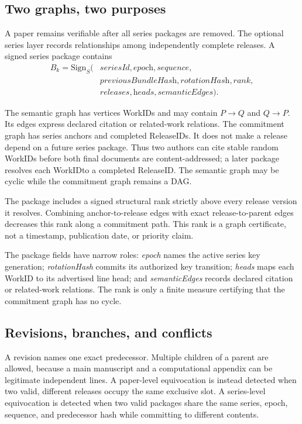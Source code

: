 \documentclass[acmsmall,screen,review,nonacm]{acmart}
\newcommand{\workid}{\textsf{WorkID}}
\newcommand{\releaseid}{\textsf{ReleaseID}}
\begin{document}
\subsection{Two graphs, two purposes}

A paper remains verifiable after all series packages are removed. The optional series layer records relationships among independently complete releases. A signed series package contains
\[
\begin{aligned}
  B_k = \mathrm{Sign}_{S}(&\textit{seriesId},\textit{epoch},\textit{sequence},\\
                          &\textit{previousBundleHash},\textit{rotationHash},\textit{rank},\\
                          &\textit{releases},\textit{heads},\textit{semanticEdges}).
\end{aligned}
\]

The semantic graph has vertices \workid s and may contain $P \rightarrow Q$ and $Q \rightarrow P$. Its edges express declared citation or related-work relations. The commitment graph has series anchors and completed \releaseid s. It does not make a release depend on a future series package. Thus two authors can cite stable random \workid s before both final documents are content-addressed; a later package resolves each \workid to a completed \releaseid. The semantic graph may be cyclic while the commitment graph remains a DAG.

The package includes a signed structural rank strictly above every release version it resolves. Combining anchor-to-release edges with exact release-to-parent edges decreases this rank along a commitment path. This rank is a graph certificate, not a timestamp, publication date, or priority claim.

The package fields have narrow roles: \textit{epoch} names the active series
key generation; \textit{rotationHash} commits its authorized key transition;
\textit{heads} maps each WorkID to its advertised line head; and
\textit{semanticEdges} records declared citation or related-work relations.
The rank is only a finite measure certifying that the commitment graph has no
cycle.

\subsection{Revisions, branches, and conflicts}

A revision names one exact predecessor. Multiple children of a parent are allowed, because a main manuscript and a computational appendix can be legitimate independent lines. A paper-level equivocation is instead detected when two valid, different releases occupy the same exclusive slot. A series-level equivocation is detected when two valid packages share the same series, epoch, sequence, and predecessor hash while committing to different contents.
\end{document}
